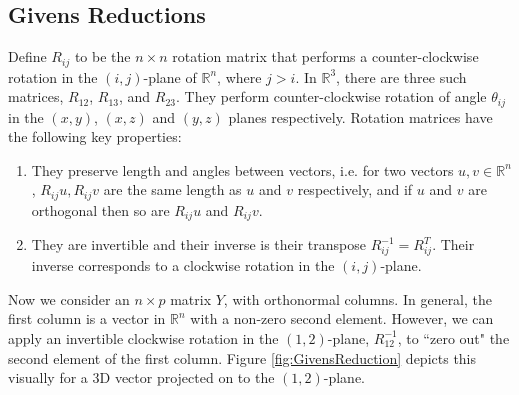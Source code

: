 \documentclass{article}
\begin{document}
\subsection{Givens Reductions}
Define $R_{ij}$ to be the $n \times n$ rotation matrix that performs a counter-clockwise rotation in the $(i,j)$-plane of $\mathbb{R}^n$, where $j > i$. In $\mathbb{R}^3$, there are three such matrices, $R_{12}$, $R_{13}$, and $R_{23}$. They perform counter-clockwise rotation of angle $\theta_{ij}$ in the $(x,y)$, $(x,z)$ and $(y,z)$ planes respectively. Rotation matrices have the following key properties:

\begin{enumerate}
\item They preserve length and angles between vectors, i.e. for two vectors $u,v \in \mathbb{R}^n$, $R_{ij} u, R_{ij} v$ are the same length as $u$ and $v$ respectively, and if $u$ and $v$ are orthogonal then so are $R_{ij}u$ and $R_{ij}v$.
\item They are invertible and their inverse is their transpose $R_{ij}^{-1} = R_{ij}^T$. Their inverse corresponds to a clockwise rotation in the $(i,j)$-plane.
\end{enumerate}

Now we consider an $n \times p$ matrix $Y$, with orthonormal columns. In general, the first column is a vector in $\mathbb{R}^n$ with a non-zero second element. However, we can apply an invertible clockwise rotation in the $(1,2)$-plane, $R_{12}^{-1}$, to ``zero out" the second element of the first column. Figure \ref{fig:GivensReduction} depicts this visually for a 3D vector projected on to the $(1,2)$-plane.
\end{document}
